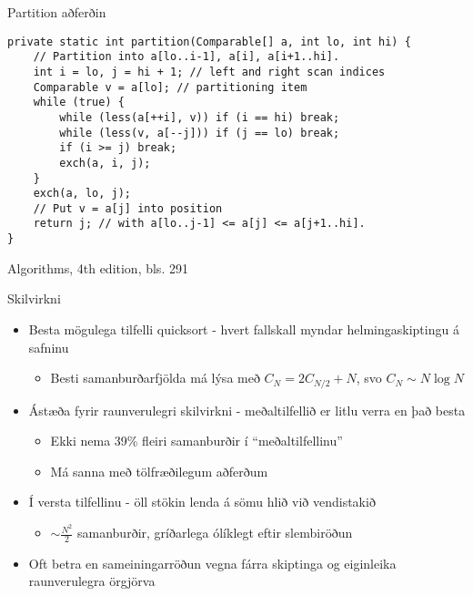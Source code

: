 \documentclass{beamer}
\begin{document}
\begin{frame}[fragile]{Partition aðferðin}
	\vspace{0.5cm}
	\begin{verbatim}
private static int partition(Comparable[] a, int lo, int hi) { 
    // Partition into a[lo..i-1], a[i], a[i+1..hi].
    int i = lo, j = hi + 1; // left and right scan indices
    Comparable v = a[lo]; // partitioning item
    while (true) {
        while (less(a[++i], v)) if (i == hi) break;
        while (less(v, a[--j])) if (j == lo) break;
        if (i >= j) break;
        exch(a, i, j);
    }
    exch(a, lo, j);
    // Put v = a[j] into position
    return j; // with a[lo..j-1] <= a[j] <= a[j+1..hi].
}
    \end{verbatim}
	\begin{center}
		Algorithms, 4th edition, bls. 291
	\end{center}
\end{frame}

\headandfoot

\begin{frame}{Skilvirkni}
	\begin{itemize}
		\item Besta mögulega tilfelli quicksort - hvert fallskall myndar helmingaskiptingu á safninu
		      \begin{itemize}
			      \item Besti samanburðarfjölda má lýsa með $C_N = 2C_{N/2} + N$, svo $C_N \sim N \log N$
		      \end{itemize}
		\item Ástæða fyrir raunverulegri skilvirkni - meðaltilfellið er litlu verra en það besta
		      \begin{itemize}
			      \item Ekki nema 39\% fleiri samanburðir í ``meðaltilfellinu''
			      \item Má sanna með tölfræðilegum aðferðum
		      \end{itemize}
		\item Í versta tilfellinu - öll stökin lenda á sömu hlið við vendistakið
		      \begin{itemize}
			      \item $\sim \frac{N^2}{2}$ samanburðir, gríðarlega ólíklegt eftir slembiröðun
		      \end{itemize}
		\item Oft betra en sameiningarröðun vegna fárra skiptinga og eiginleika raunverulegra örgjörva
	\end{itemize}
\end{frame}
\end{document}
